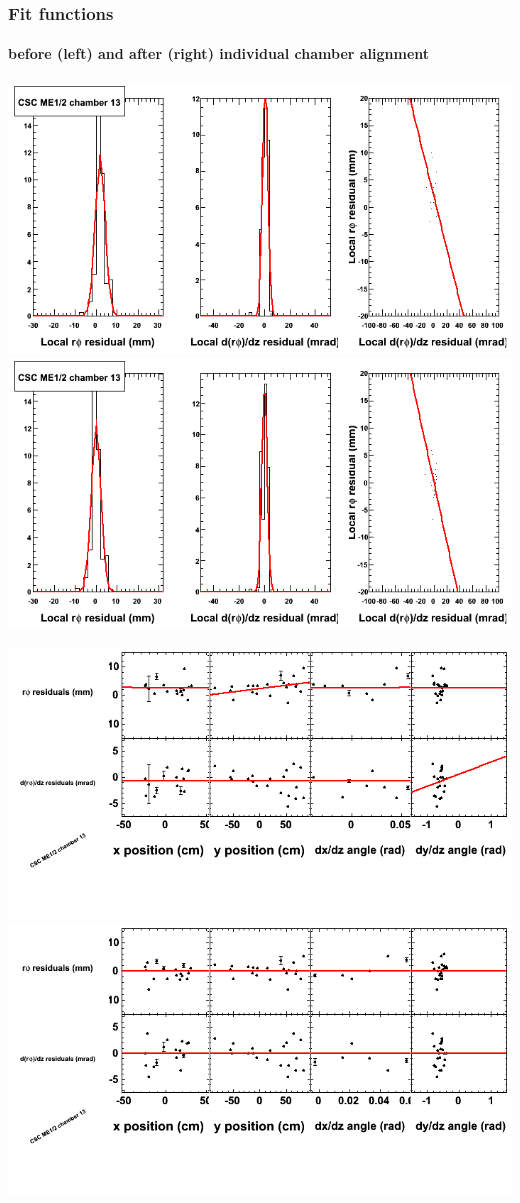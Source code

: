 \documentclass[compress]{beamer}
\begin{document}
\begin{frame}
\frametitle{Fit functions}
\framesubtitle{before (left) and after (right) individual chamber alignment}
\includegraphics[width=0.5\linewidth]{ringfits_3dof/beforefit_MEp12_13_bellcurve.png} \includegraphics[width=0.5\linewidth]{ringfits_3dof/afterfit_MEp12_13_bellcurve.png}

\includegraphics[width=0.5\linewidth]{ringfits_3dof/beforefit_MEp12_13_polynomials.png} \includegraphics[width=0.5\linewidth]{ringfits_3dof/afterfit_MEp12_13_polynomials.png}
\end{frame}
\end{document}
